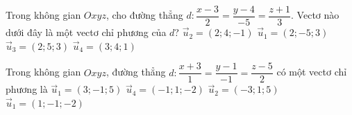 \begin{ex}%
	Trong không gian $Oxyz$, cho đường thẳng $d:\dfrac{x-3}{2}=\dfrac{y-4}{-5}=\dfrac{z+1}{3}$. Vectơ nào dưới đây là một vectơ chỉ phương của $d$?
	\choice
		{$\overrightarrow{u}_2=\left(2;4;-1\right)$}
		{\True $\overrightarrow{u}_1=\left(2;-5;3\right)$}
		{$\overrightarrow{u}_3=\left(2;5;3\right)$}
		{$\overrightarrow{u}_4=\left(3;4;1\right)$}
\end{ex}

\begin{ex}%
	Trong không gian $Oxyz$, đường thẳng $d:\dfrac{x+3}{1}=\dfrac{y-1}{-1}=\dfrac{z-5}{2}$ có một vectơ chỉ phương là
	\choice
		{$\overrightarrow{u}_1=\left(3;-1; 5\right)$}
		{\True $\overrightarrow{u}_4=\left(-1; 1;-2\right)$}
		{$\overrightarrow{u}_2=\left(-3; 1; 5\right)$}
		{$\overrightarrow{u}_1=\left(1;-1;-2\right)$}
\end{ex}

